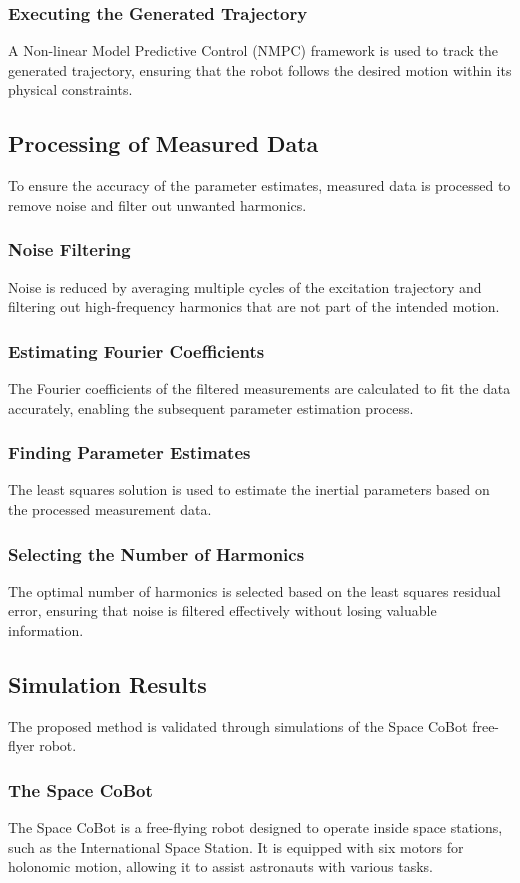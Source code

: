 \documentclass[a4paper,12pt]{article}
\begin{document}
\subsubsection{Executing the Generated Trajectory}
A Non-linear Model Predictive Control (NMPC) framework is used to track the generated trajectory, ensuring that the robot follows the desired motion within its physical constraints.

\subsection{Processing of Measured Data}
To ensure the accuracy of the parameter estimates, measured data is processed to remove noise and filter out unwanted harmonics.
\subsubsection{Noise Filtering}
Noise is reduced by averaging multiple cycles of the excitation trajectory and filtering out high-frequency harmonics that are not part of the intended motion.
\subsubsection{Estimating Fourier Coefficients}
The Fourier coefficients of the filtered measurements are calculated to fit the data accurately, enabling the subsequent parameter estimation process.
\subsubsection{Finding Parameter Estimates}
The least squares solution is used to estimate the inertial parameters based on the processed measurement data.
\subsubsection{Selecting the Number of Harmonics}
The optimal number of harmonics is selected based on the least squares residual error, ensuring that noise is filtered effectively without losing valuable information.

\subsection{Simulation Results}
The proposed method is validated through simulations of the Space CoBot free-flyer robot.
\subsubsection{The Space CoBot}
The Space CoBot is a free-flying robot designed to operate inside space stations, such as the International Space Station. It is equipped with six motors for holonomic motion, allowing it to assist astronauts with various tasks.
\end{document}
